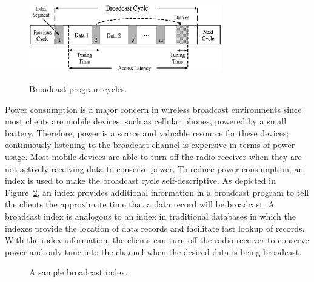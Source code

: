 \begin{figure}[!t]
\begin{center}
\includegraphics[width=3.3in]{Figures/BroadcastCycle.eps}
\vspace*{-15pt} \caption{Broadcast program cycles.}\vspace*{-10pt}
\label{fig:bcastcycle}
\end{center}
\end{figure}

Power consumption is a major concern in wireless broadcast
environments since most clients are mobile devices, such as
cellular phones, powered by a small battery. Therefore, power is a
scarce and valuable resource for these devices; continuously
listening to the broadcast channel is expensive in terms of power
usage. Most mobile devices are able to turn off the radio receiver
when they are not actively receiving data to conserve power. To
reduce power consumption, an index is used to make the broadcast
cycle self-descriptive. As depicted in
Figure~\ref{fig:index_node}, an index provides additional
information in a broadcast program to tell the clients the
approximate time that a data record will be broadcast. A broadcast
index is analogous to an index in traditional databases in which
the indexes provide the location of data records and facilitate
fast lookup of records. With the index information, the clients
can turn off the radio receiver to conserve power and only tune
into the channel when the desired data is being broadcast.

\begin{figure}[!b]
\centering {} \vspace*{-10pt} \caption{A sample broadcast index.}
\label{fig:index_node}
\end{figure}


